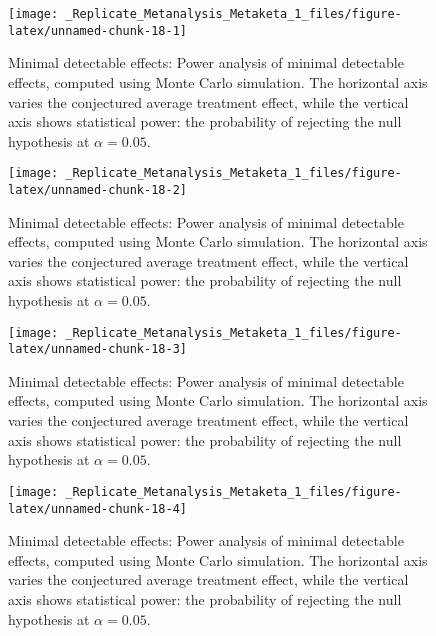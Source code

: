 \documentclass[]{article}
\begin{document}
\begin{figure}

{\centering \texttt{[image: \_Replicate\_Metanalysis\_Metaketa\_1\_files/figure-latex/unnamed-chunk-18-1]} 

}

\caption{Minimal detectable effects: Power analysis of minimal detectable effects, computed using Monte Carlo simulation. The horizontal axis varies the conjectured average treatment effect, while the vertical axis shows statistical power: the probability of rejecting the null hypothesis at $\alpha=0.05$.}\label{fig:unnamed-chunk-181}
\end{figure}\begin{figure}

{\centering \texttt{[image: \_Replicate\_Metanalysis\_Metaketa\_1\_files/figure-latex/unnamed-chunk-18-2]} 

}

\caption{Minimal detectable effects: Power analysis of minimal detectable effects, computed using Monte Carlo simulation. The horizontal axis varies the conjectured average treatment effect, while the vertical axis shows statistical power: the probability of rejecting the null hypothesis at $\alpha=0.05$.}\label{fig:unnamed-chunk-182}
\end{figure}\begin{figure}

{\centering \texttt{[image: \_Replicate\_Metanalysis\_Metaketa\_1\_files/figure-latex/unnamed-chunk-18-3]} 

}

\caption{Minimal detectable effects: Power analysis of minimal detectable effects, computed using Monte Carlo simulation. The horizontal axis varies the conjectured average treatment effect, while the vertical axis shows statistical power: the probability of rejecting the null hypothesis at $\alpha=0.05$.}\label{fig:unnamed-chunk-183}
\end{figure}\begin{figure}

{\centering \texttt{[image: \_Replicate\_Metanalysis\_Metaketa\_1\_files/figure-latex/unnamed-chunk-18-4]} 

}

\caption{Minimal detectable effects: Power analysis of minimal detectable effects, computed using Monte Carlo simulation. The horizontal axis varies the conjectured average treatment effect, while the vertical axis shows statistical power: the probability of rejecting the null hypothesis at $\alpha=0.05$.}\label{fig:unnamed-chunk-184}
\end{figure}
\end{document}

